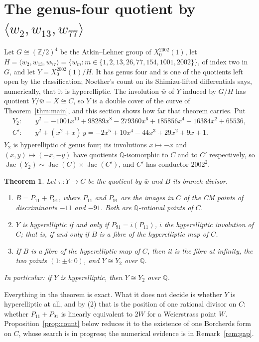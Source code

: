 \documentclass[11pt,reqno]{amsart}
\theoremstyle{plain}
\newtheorem{theorem}{Theorem}
\theoremstyle{definition}
\DeclareMathOperator{\Jac}{Jac}
\newcommand{\Q}{\mathbb{Q}}
\newcommand{\Z}{\mathbb{Z}}
\begin{document}
\section{The genus-four quotient by $\langle w_2,w_{13},w_{77}\rangle$}\label{sec:genus4}

Let $G\cong(\Z/2)^4$ be the Atkin--Lehner group of $X_0^{2002}(1)$, let
$H=\langle w_2,w_{13},w_{77}\rangle=\{w_m : m\in\{1,2,13,26,77,154,1001,2002\}\}$, of index two in
$G$, and let $Y=X_0^{2002}(1)/H$. It has genus four and is one of the quotients left open by the
classification; Noether's count on its Shimizu-lifted differentials says, numerically, that it is
hyperelliptic. The involution $\bar w$ of $Y$ induced by $G/H$ has quotient $Y/\bar w=X\cong C$, so
$Y$ is a double cover of the curve of Theorem~\ref{thm:main}, and this section shows how far that
theorem carries. Put
\begin{align*}
  Y_2:&\quad y^2=-1001x^{10}+98289x^8-279360x^6+185856x^4-16384x^2+65536,\\
  C':&\quad y^2+(x^2+x)\,y=-2x^5+10x^4-44x^3+29x^2+9x+1 .
\end{align*}
$Y_2$ is hyperelliptic of genus four; its involutions $x\mapsto-x$ and $(x,y)\mapsto(-x,-y)$ have
quotients $\Q$-isomorphic to $C$ and to $C'$ respectively, so $\Jac(Y_2)\sim\Jac(C)\times\Jac(C')$,
and $C'$ has conductor $2002^2$.

\begin{theorem}\label{thm:genus4}
Let $\pi\colon Y\to C$ be the quotient by $\bar w$ and $B$ its branch divisor.
\begin{enumerate}
\item $B=P_{11}+P_{91}$, where $P_{11}$ and $P_{91}$ are the images in $C$ of the CM points of
  discriminants $-11$ and $-91$. Both are $\Q$-rational points of $C$.
\item $Y$ is hyperelliptic if and only if $P_{91}=\bar\iota(P_{11})$, $\bar\iota$ the hyperelliptic
  involution of $C$; that is, if and only if $B$ is a fibre of the hyperelliptic map of $C$.
\item If $B$ is a fibre of the hyperelliptic map of $C$, then it is the fibre at infinity, the two
  points $(1:\pm4:0)$, and $Y\cong Y_2$ over $\Q$.
\end{enumerate}
In particular: if $Y$ is hyperelliptic, then $Y\cong Y_2$ over $\Q$.
\end{theorem}

Everything in the theorem is exact. What it does not decide is whether $Y$ is hyperelliptic at
all, and by (2) that is the position of one rational divisor on $C$: whether $P_{11}+P_{91}$ is
linearly equivalent to $2W$ for a Weierstrass point $W$. Proposition~\ref{prop:count} below reduces
it to the existence of one Borcherds form on $C$, whose search is in progress; the numerical
evidence is in Remark~\ref{rem:gap}.
\end{document}
